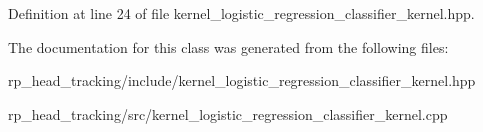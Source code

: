 \-Definition at line 24 of file kernel\-\_\-logistic\-\_\-regression\-\_\-classifier\-\_\-kernel.\-hpp.



\-The documentation for this class was generated from the following files\-:\begin{DoxyCompactItemize}
\item 
rp\-\_\-head\-\_\-tracking/include/kernel\-\_\-logistic\-\_\-regression\-\_\-classifier\-\_\-kernel.\-hpp\item 
rp\-\_\-head\-\_\-tracking/src/kernel\-\_\-logistic\-\_\-regression\-\_\-classifier\-\_\-kernel.\-cpp\end{DoxyCompactItemize}
